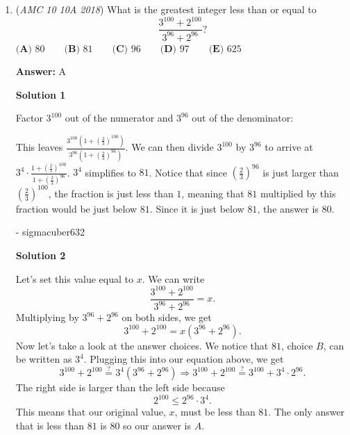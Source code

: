 \begin{enumerate}
 Setting $DC=x$, we have a right triangle $\triangle{BCD}$ with legs of x and 3, and, because $AD=DB,$ hypotenuse of $(4-x)$.

 $x^2+3^2=(4-x)^2 \implies x^2+9=16-8x+x^2 \implies 8x=7 \implies x=\frac{7}{8}$

 The area of $\triangle{BCD}  \text{ is thus} = \frac{7}{8}*3*\frac{1}{2} \implies \frac{21}{16}.$ Because $[ADB]=[ABC]-[BCD],$ we can plug in and see that $[ADB]=6-\frac{21}{16}=\frac{75}{16}.$

 Since $A=\frac{bh}{2}$, we get $\frac{75}{16}=\frac{5h}{2} \implies 5h=\frac{75}{8} \implies h=\boxed{\textbf{(D) }\frac{15}{8}}$



	\item (\textit{AMC 10 10A 2018}) What is the greatest integer less than or equal to 
 \[\frac{3^{100}+2^{100}}{3^{96}+2^{96}}?\]
$\textbf{(A) }80\qquad \textbf{(B) }81 \qquad \textbf{(C) }96 \qquad \textbf{(D) }97 \qquad \textbf{(E) }625\qquad$

 \textbf{Answer: }A



\textbf{Solution 1}

Factor $3^{100}$ out of the numerator and $3^{96}$ out of the denominator:

 This leaves $\frac{3^{100}\left(1+\left(\frac{2}{3}\right)^{100}\right)}{3^{96}\left(1+\left(\frac{2}{3}\right)^{96}\right)}$. We can then divide $3^{100}$ by $3^{96}$ to arrive at $3^{4}\cdot\frac{1+\left(\frac{2}{3}\right)^{100}}{1+\left(\frac{2}{3}\right)^{96}}$. $3^{4}$ simplifies to $81$. Notice that since $\left(\frac{2}{3}\right)^{96}$ is just larger than $\left(\frac{2}{3}\right)^{100}$, the fraction is just less than $1$, meaning that $81$ multiplied by this fraction would be just below $81$. Since it is just below $81$, the answer is $\boxed{80}$.

 - sigmacuber632

 



\textbf{Solution 2}

Let's set this value equal to $x$. We can write
 \[\frac{3^{100}+2^{100}}{3^{96}+2^{96}}=x.\]Multiplying by $3^{96}+2^{96}$ on both sides, we get 
 \[3^{100}+2^{100}=x(3^{96}+2^{96}).\]Now let's take a look at the answer choices. We notice that $81$, choice $B$, can be written as $3^4$. Plugging this into our equation above, we get
 \[3^{100}+2^{100} \stackrel{?}{=} 3^4(3^{96}+2^{96}) \Rightarrow 3^{100}+2^{100} \stackrel{?}{=} 3^{100}+3^4\cdot 2^{96}.\]The right side is larger than the left side because 
 \[2^{100} \leq 2^{96}\cdot 3^4.\]This means that our original value, $x$, must be less than $81$. The only answer that is less than $81$ is $80$ so our answer is $\boxed{A}$.


\end{enumerate}
